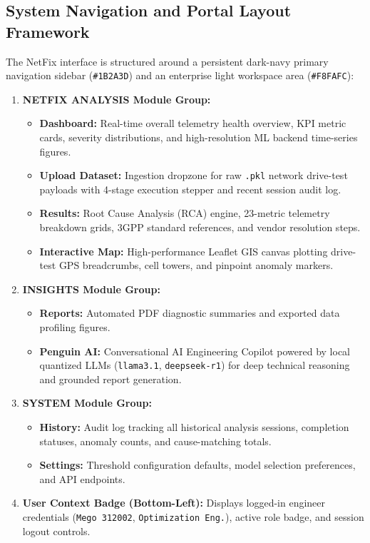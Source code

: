 \documentclass[12pt,a4paper]{article}
\begin{document}
\subsection{System Navigation and Portal Layout Framework}
The NetFix interface is structured around a persistent dark-navy primary navigation sidebar (\texttt{\#1B2A3D}) and an enterprise light workspace area (\texttt{\#F8FAFC}):
\begin{enumerate}
    \item \textbf{NETFIX ANALYSIS Module Group:}
    \begin{itemize}
        \item \textbf{Dashboard:} Real-time overall telemetry health overview, KPI metric cards, severity distributions, and high-resolution ML backend time-series figures.
        \item \textbf{Upload Dataset:} Ingestion dropzone for raw \texttt{.pkl} network drive-test payloads with 4-stage execution stepper and recent session audit log.
        \item \textbf{Results:} Root Cause Analysis (RCA) engine, 23-metric telemetry breakdown grids, 3GPP standard references, and vendor resolution steps.
        \item \textbf{Interactive Map:} High-performance Leaflet GIS canvas plotting drive-test GPS breadcrumbs, cell towers, and pinpoint anomaly markers.
    \end{itemize}
    \item \textbf{INSIGHTS Module Group:}
    \begin{itemize}
        \item \textbf{Reports:} Automated PDF diagnostic summaries and exported data profiling figures.
        \item \textbf{Penguin AI:} Conversational AI Engineering Copilot powered by local quantized LLMs (\texttt{llama3.1}, \texttt{deepseek-r1}) for deep technical reasoning and grounded report generation.
    \end{itemize}
    \item \textbf{SYSTEM Module Group:}
    \begin{itemize}
        \item \textbf{History:} Audit log tracking all historical analysis sessions, completion statuses, anomaly counts, and cause-matching totals.
        \item \textbf{Settings:} Threshold configuration defaults, model selection preferences, and API endpoints.
    \end{itemize}
    \item \textbf{User Context Badge (Bottom-Left):} Displays logged-in engineer credentials (\texttt{Mego 312002}, \texttt{Optimization Eng.}), active role badge, and session logout controls.
\end{enumerate}
\end{document}

